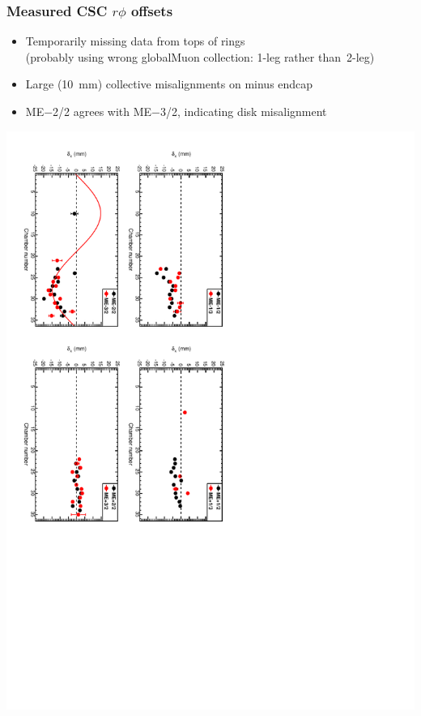 \documentclass[compress]{beamer}
\begin{document}
\begin{frame}
\frametitle{Measured CSC $r\phi$ offsets}

\begin{itemize}
\item Temporarily missing data from tops of rings \\ (probably using wrong globalMuon collection: 1-leg rather \mbox{than 2-leg)\hspace{-1 cm}}
\item Large (10~mm) collective misalignments on minus endcap
\item ME$-$2/2 agrees with ME$-$3/2, indicating disk misalignment
\end{itemize}

\includegraphics[height=\linewidth, angle=90]{data_endcap_alignments.pdf}
\end{frame}
\end{document}
